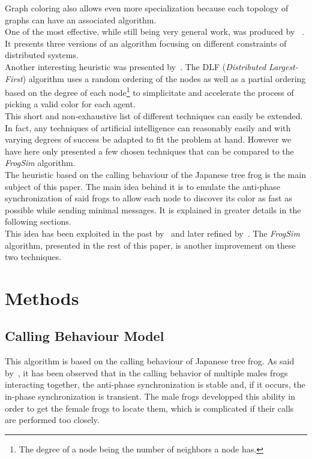 \documentclass[letterpaper]{article}
\begin{document}
Graph coloring also allows even more specialization because each topology of graphs can have an associated algorithm.\\

One of the most effective, while still being very general work, was produced by ~\cite{Finocchi2002EAS}. It presents three versions of an algorithm focusing on different constraints of distributed systems.\\

Another interesting heuristic was presented by~\cite{KubaleKuzner}. The DLF (\emph{Distributed Largest-First}) algorithm uses a random ordering of the nodes as well as a partial ordering based on the degree of each node\footnote{The degree of a node being the number of neighbors a node has.} to simplicitate and accelerate the process of picking a valid color for each agent.\\

This short and non-exhaustive list of different techniques can easily be extended. In fact, any techniques of artificial intelligence can reasonably easily and with varying degrees of success be adapted to fit the problem at hand. However we have here only presented a few chosen techniques that can be compared to the \emph{FrogSim} algorithm.\\

The heuristic based on the calling behaviour of the Japanese tree frog is the main subject of this paper. The main idea behind it is to emulate the anti-phase synchronization of said frogs to allow each node to discover its color as fast as possible while sending minimal messages. It is explained in greater details in the following sections.\\

This idea has been exploited in the past by~\cite{Lee2008EDP} and later refined by~\cite{Lee2010}. The \emph{FrogSim} algorithm, presented in the rest of this paper, is another improvement on these two techniques.

\section{Methods}
\subsection{Calling Behaviour Model}
This algorithm is based on the calling behaviour of Japanese tree frog. As said by~\cite{Aihara}, it has been observed that in the calling behavior of multiple males frogs interacting together, the anti-phase synchronization is stable and, if it occurs, the in-phase synchronization is transient. The male frogs developped this ability in order to get the female frogs to locate them, which is complicated if their calls are performed too closely.\\
\end{document}
